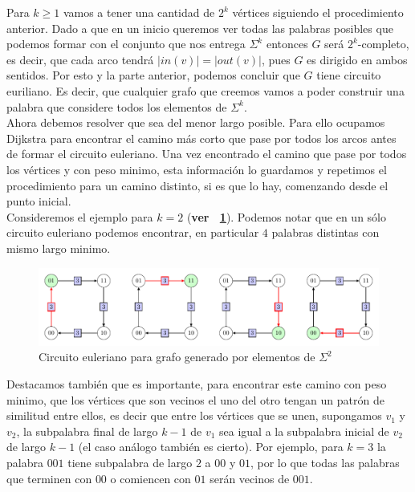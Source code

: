 \documentclass[letterpaper,10pt,table, dvipsnames]{article}
\newcommand{\figref}[1]{\figurename~\ref{#1}}
\begin{document}
Para $k\geq 1$ vamos a tener una cantidad de $2^k$ vértices siguiendo el procedimiento anterior. Dado a que en un inicio queremos ver todas las palabras posibles que podemos formar con el conjunto que nos entrega $\Sigma^k $ entonces $G$ será $2^k$-completo, es decir, que cada arco tendrá $|in(v)|=|out(v)|$, pues $G$ es dirigido en ambos sentidos. Por esto y la parte anterior, podemos concluir que $G$ tiene circuito euriliano. Es decir, que cualquier grafo que creemos vamos a poder construir una palabra que considere todos los elementos de $\Sigma^k$.\\

Ahora debemos resolver que sea del menor largo posible. Para ello ocupamos Dijkstra para encontrar el camino más corto que pase por todos los arcos antes de formar el circuito euleriano. Una vez encontrado el camino que pase por todos los vértices y con peso minimo, esta información lo guardamos y repetimos el procedimiento para un camino distinto, si es que lo hay, comenzando desde el punto inicial. \\

Consideremos el ejemplo para $k=2$ (\textbf{ver \figref{fig:ej2}}). Podemos notar que en un sólo circuito euleriano podemos encontrar, en particular $4$ palabras distintas con mismo largo minimo. \\

\begin{figure}[h]
  \centering
  \includegraphics[scale=0.8]{pictures/t3/g_tam2.pdf}
  \caption{Circuito euleriano para grafo generado por elementos de $\Sigma^2$}
  \label{fig:ej2}
\end{figure}

Destacamos también que es importante, para encontrar este camino con peso minimo, que los vértices que son vecinos el uno del otro tengan un patrón de similitud entre ellos, es decir que entre los vértices que se unen, supongamos $v_{1}$ y $v_2$, la subpalabra final de largo $k-1$ de $v_1$ sea igual a la subpalabra inicial de $v_2$ de largo $k-1$ (el caso análogo también es cierto). Por ejemplo, para $k=3$ la palabra $001$ tiene subpalabra de largo $2$ a $00$ y $01$, por lo que todas las palabras que terminen con $00$ o comiencen con $01$ serán vecinos de $001$. 
\end{document}

